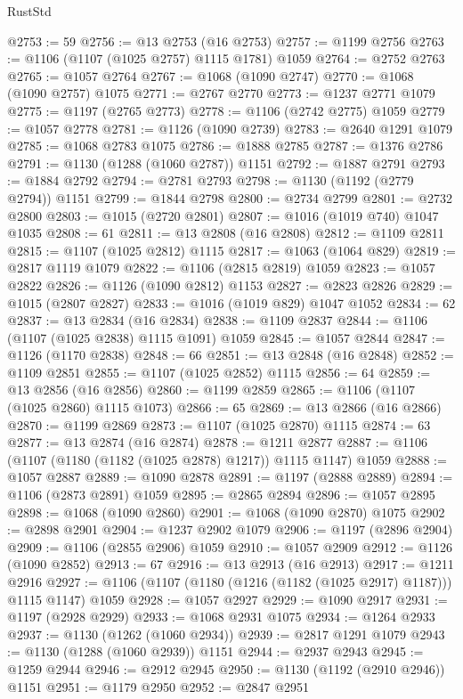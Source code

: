 \begin{lexlean}{RustStd}
\begin{coremodule}
@2753 := 59
@2756 := @13 @2753 (@16 @2753)
@2757 := @1199 @2756
@2763 := @1106 (@1107 (@1025 @2757) @1115 @1781) @1059
@2764 := @2752 @2763
@2765 := @1057 @2764
@2767 := @1068 (@1090 @2747)
@2770 := @1068 (@1090 @2757) @1075
@2771 := @2767 @2770
@2773 := @1237 @2771 @1079
@2775 := @1197 (@2765 @2773)
@2778 := @1106 (@2742 @2775) @1059
@2779 := @1057 @2778
@2781 := @1126 (@1090 @2739)
@2783 := @2640 @1291 @1079
@2785 := @1068 @2783 @1075
@2786 := @1888 @2785
@2787 := @1376 @2786
@2791 := @1130 (@1288 (@1060 @2787)) @1151
@2792 := @1887 @2791
@2793 := @1884 @2792
@2794 := @2781 @2793
@2798 := @1130 (@1192 (@2779 @2794)) @1151
@2799 := @1844 @2798
@2800 := @2734 @2799
@2801 := @2732 @2800
@2803 := @1015 (@2720 @2801)
@2807 := @1016 (@1019 @740) @1047 @1035
@2808 := 61
@2811 := @13 @2808 (@16 @2808)
@2812 := @1109 @2811
@2815 := @1107 (@1025 @2812) @1115
@2817 := @1063 (@1064 @829)
@2819 := @2817 @1119 @1079
@2822 := @1106 (@2815 @2819) @1059
@2823 := @1057 @2822
@2826 := @1126 (@1090 @2812) @1153
@2827 := @2823 @2826
@2829 := @1015 (@2807 @2827)
@2833 := @1016 (@1019 @829) @1047 @1052
@2834 := 62
@2837 := @13 @2834 (@16 @2834)
@2838 := @1109 @2837
@2844 := @1106 (@1107 (@1025 @2838) @1115 @1091) @1059
@2845 := @1057 @2844
@2847 := @1126 (@1170 @2838)
@2848 := 66
@2851 := @13 @2848 (@16 @2848)
@2852 := @1109 @2851
@2855 := @1107 (@1025 @2852) @1115
@2856 := 64
@2859 := @13 @2856 (@16 @2856)
@2860 := @1199 @2859
@2865 := @1106 (@1107 (@1025 @2860) @1115 @1073)
@2866 := 65
@2869 := @13 @2866 (@16 @2866)
@2870 := @1199 @2869
@2873 := @1107 (@1025 @2870) @1115
@2874 := 63
@2877 := @13 @2874 (@16 @2874)
@2878 := @1211 @2877
@2887 := @1106 (@1107 (@1180 (@1182 (@1025 @2878) @1217)) @1115 @1147) @1059
@2888 := @1057 @2887
@2889 := @1090 @2878
@2891 := @1197 (@2888 @2889)
@2894 := @1106 (@2873 @2891) @1059
@2895 := @2865 @2894
@2896 := @1057 @2895
@2898 := @1068 (@1090 @2860)
@2901 := @1068 (@1090 @2870) @1075
@2902 := @2898 @2901
@2904 := @1237 @2902 @1079
@2906 := @1197 (@2896 @2904)
@2909 := @1106 (@2855 @2906) @1059
@2910 := @1057 @2909
@2912 := @1126 (@1090 @2852)
@2913 := 67
@2916 := @13 @2913 (@16 @2913)
@2917 := @1211 @2916
@2927 := @1106 (@1107 (@1180 (@1216 (@1182 (@1025 @2917) @1187))) @1115 @1147) @1059
@2928 := @1057 @2927
@2929 := @1090 @2917
@2931 := @1197 (@2928 @2929)
@2933 := @1068 @2931 @1075
@2934 := @1264 @2933
@2937 := @1130 (@1262 (@1060 @2934))
@2939 := @2817 @1291 @1079
@2943 := @1130 (@1288 (@1060 @2939)) @1151
@2944 := @2937 @2943
@2945 := @1259 @2944
@2946 := @2912 @2945
@2950 := @1130 (@1192 (@2910 @2946)) @1151
@2951 := @1179 @2950
@2952 := @2847 @2951

\end{coremodule}
\end{lexlean}
